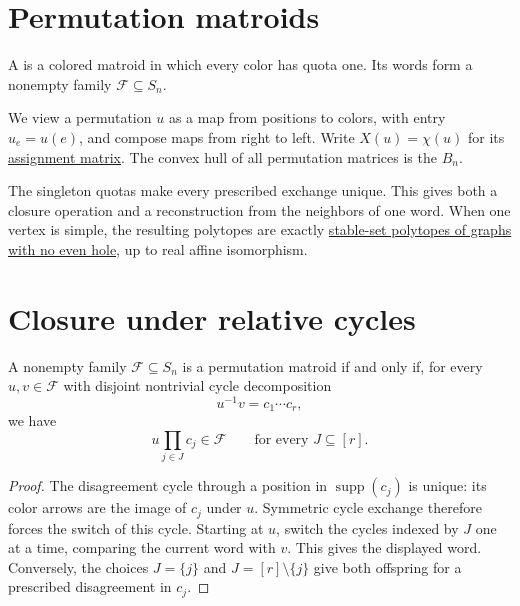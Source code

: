 
\section[permutationMatroids]{Permutation matroids}

\begin{definition}
A  is a colored matroid in which every color
has quota one. Its words form a nonempty family $\mathcal F\subseteq S_n$.
\end{definition}

We view a permutation $u$ as a map from positions to colors, with entry
$u_e=u(e)$, and compose maps from right to left. Write $X(u)=\chi(u)$ for
its \href{polytope.htm#polytope}{assignment matrix}. The convex hull of all
permutation matrices is the  $B_n$.

The singleton quotas make every prescribed exchange unique. This gives
both a closure operation and a reconstruction from the neighbors of one
word. When one vertex is simple, the resulting polytopes are exactly
\href{stable-sets.htm#simpleVertexClassification}{stable-set polytopes of
graphs with no even hole}, up to real affine isomorphism.

\section[relativeCycles]{Closure under relative cycles}

\begin{theorem}
A nonempty family $\mathcal F\subseteq S_n$ is a permutation matroid
if and only if, for every $u,v\in\mathcal F$ with disjoint nontrivial
cycle decomposition
\[
 u^{-1}v=c_1\dotsm c_r,
\]
we have
\[
 u\prod_{j\in J}c_j\in\mathcal F
 \qquad\text{for every }J\subseteq[r].
\]
\end{theorem}

\begin{proof}
The disagreement cycle through a position in $\operatorname{supp}(c_j)$
is unique: its color arrows are the image of $c_j$ under $u$.
Symmetric cycle exchange therefore forces the switch of this cycle.
Starting at $u$, switch the cycles indexed by $J$ one at a time,
comparing the current word with $v$. This gives the displayed word.
Conversely, the choices $J=\{j\}$ and $J=[r]\setminus\{j\}$ give
both offspring for a prescribed disagreement in $c_j$.
\end{proof}

